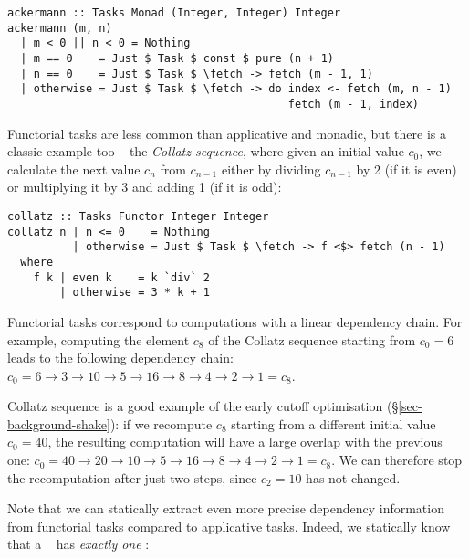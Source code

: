 \vspace{1mm}
\begin{verbatim}
ackermann :: Tasks Monad (Integer, Integer) Integer
ackermann (m, n)
  | m < 0 || n < 0 = Nothing
  | m == 0    = Just $ Task $ const $ pure (n + 1)
  | n == 0    = Just $ Task $ \fetch -> fetch (m - 1, 1)
  | otherwise = Just $ Task $ \fetch -> do index <- fetch (m, n - 1)
                                           fetch (m - 1, index)
\end{verbatim}
\vspace{1mm}

\noindent
Functorial tasks are less common than applicative and monadic, but there is a
classic example too -- the \emph{Collatz sequence}, where given an initial value
$c_0$, we calculate the next value $c_n$ from $c_{n-1}$ either by dividing
$c_{n-1}$ by 2 (if it is even) or multiplying it by 3 and adding 1 (if it is
odd):

\vspace{1mm}
\begin{verbatim}
collatz :: Tasks Functor Integer Integer
collatz n | n <= 0    = Nothing
          | otherwise = Just $ Task $ \fetch -> f <$> fetch (n - 1)
  where
    f k | even k    = k `div` 2
        | otherwise = 3 * k + 1
\end{verbatim}
\vspace{1mm}

\noindent
Functorial tasks correspond to computations with a linear dependency chain. For
example, computing the element $c_8$ of the Collatz sequence starting from
$c_0=6$ leads to the following dependency chain:
$c_0 = 6 \rightarrow 3 \rightarrow 10 \rightarrow 5 \rightarrow 16 \rightarrow 8
\rightarrow 4 \rightarrow 2 \rightarrow 1 = c_8$.

Collatz sequence is a good example of the early cutoff optimisation
(\S\ref{sec-background-shake}): if we recompute $c_8$ starting from a different
initial value $c_0=40$, the resulting computation will have a large overlap with
the previous one:
$c_0 = 40 \rightarrow 20 \rightarrow 10 \rightarrow 5 \rightarrow 16 \rightarrow
8 \rightarrow 4 \rightarrow 2 \rightarrow 1 = c_8$. We can therefore stop the
recomputation after just two steps, since $c_2=10$ has not changed.

Note that we can statically extract even more precise dependency information
from functorial tasks compared to applicative tasks. Indeed, we statically know
that a ~ has \emph{exactly one} :

